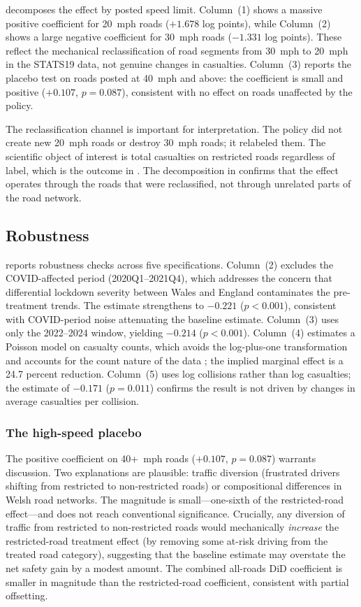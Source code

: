 \documentclass[12pt]{article}
\begin{document}
 decomposes the effect by posted speed limit. Column~(1) shows a massive positive coefficient for 20~mph roads ($+1.678$ log points), while Column~(2) shows a large negative coefficient for 30~mph roads ($-1.331$ log points). These reflect the mechanical reclassification of road segments from 30~mph to 20~mph in the STATS19 data, not genuine changes in casualties. Column~(3) reports the placebo test on roads posted at 40~mph and above: the coefficient is small and positive ($+0.107$, $p = 0.087$), consistent with no effect on roads unaffected by the policy.

The reclassification channel is important for interpretation. The policy did not create new 20~mph roads or destroy 30~mph roads; it relabeled them. The scientific object of interest is total casualties on restricted roads regardless of label, which is the outcome in . The decomposition in  confirms that the effect operates through the roads that were reclassified, not through unrelated parts of the road network.

\subsection{Robustness}



 reports robustness checks across five specifications. Column~(2) excludes the COVID-affected period (2020Q1--2021Q4), which addresses the concern that differential lockdown severity between Wales and England contaminates the pre-treatment trends. The estimate strengthens to $-0.221$ ($p < 0.001$), consistent with COVID-period noise attenuating the baseline estimate. Column~(3) uses only the 2022--2024 window, yielding $-0.214$ ($p < 0.001$). Column~(4) estimates a Poisson model on casualty counts, which avoids the log-plus-one transformation and accounts for the count nature of the data \citep{silva2006}; the implied marginal effect is a 24.7 percent reduction. Column~(5) uses log collisions rather than log casualties; the estimate of $-0.171$ ($p = 0.011$) confirms the result is not driven by changes in average casualties per collision.

\subsubsection*{The high-speed placebo} The positive coefficient on 40+~mph roads ($+0.107$, $p = 0.087$) warrants discussion. Two explanations are plausible: traffic diversion (frustrated drivers shifting from restricted to non-restricted roads) or compositional differences in Welsh road networks. The magnitude is small---one-sixth of the restricted-road effect---and does not reach conventional significance. Crucially, any diversion of traffic from restricted to non-restricted roads would mechanically \textit{increase} the restricted-road treatment effect (by removing some at-risk driving from the treated road category), suggesting that the baseline estimate may overstate the net safety gain by a modest amount. The combined all-roads DiD coefficient is smaller in magnitude than the restricted-road coefficient, consistent with partial offsetting.
\end{document}
